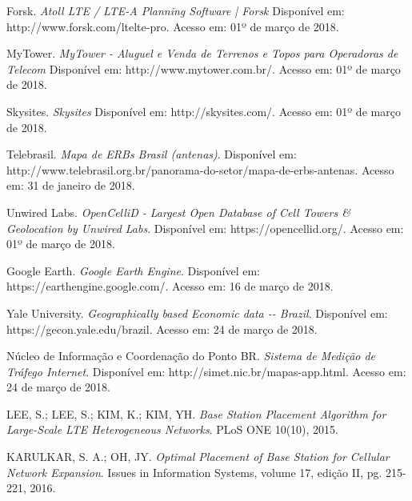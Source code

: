 \documentclass[]{politex}
\begin{document}
\begin{thebibliography}{9}
    
    Forsk.
    \textit{Atoll LTE / LTE-A Planning Software | Forsk}
    Disponível em: http://www.forsk.com/ltelte-pro.
    Acesso em: 01º de março de 2018.

    MyTower.
    \textit{MyTower - Aluguel e Venda de Terrenos e Topos para
    Operadoras de Telecom}
    Disponível em: http://www.mytower.com.br/.
    Acesso em: 01º de março de 2018.

    Skysites.
    \textit{Skysites}
    Disponível em: http://skysites.com/.
    Acesso em: 01º de março de 2018.

    Telebrasil.
    \textit{Mapa de ERBs Brasil (antenas)}.
    Disponível em:
    http://www.telebrasil.org.br/panorama-do-setor/mapa-de-erbs-antenas.
    Acesso em: 31 de janeiro de 2018.

    Unwired Labs.
    \textit{OpenCelliD - Largest Open Database of Cell Towers \&
    Geolocation by Unwired Labs}.
    Disponível em: https://opencellid.org/.
    Acesso em: 01º de março de 2018.

    Google Earth.
    \textit{Google Earth Engine}.
    Disponível em: https://earthengine.google.com/.
    Acesso em: 16 de março de 2018.

    Yale University.
    \textit{Geographically based Economic data -{}- Brazil}.
    Disponível em: https://gecon.yale.edu/brazil.
    Acesso em: 24 de março de 2018.

    Núcleo de Informação e Coordenação do Ponto BR.
    \textit{Sistema de Medição de Tráfego Internet}.
    Disponível em: http://simet.nic.br/mapas-app.html.
    Acesso em: 24 de março de 2018.

    LEE, S.; LEE, S.; KIM, K.; KIM, YH.
    \textit{Base Station Placement Algorithm for Large-Scale LTE
    Heterogeneous Networks}.
    PLoS ONE 10(10), 2015.

    KARULKAR, S. A.; OH, JY.
    \textit{Optimal Placement of Base Station for Cellular Network Expansion}.
    Issues in Information Systems, volume 17, edição II, pg. 215-221, 2016.

\end{thebibliography}
\apendice


\anexo
\end{document}
